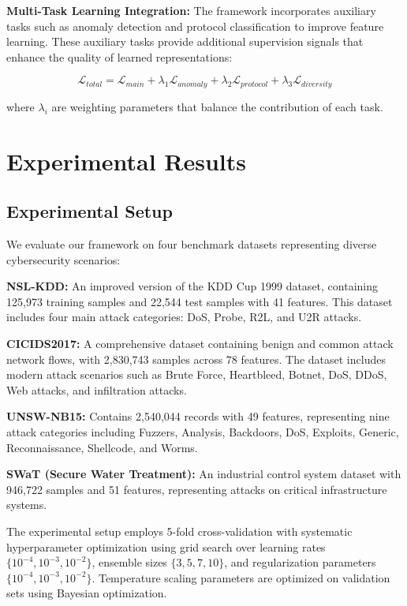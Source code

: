 \documentclass[journal]{IEEEtran}
\begin{document}
\textbf{Multi-Task Learning Integration:} The framework incorporates auxiliary tasks such as anomaly detection and protocol classification to improve feature learning. These auxiliary tasks provide additional supervision signals that enhance the quality of learned representations:

\begin{equation}
\mathcal{L}_{total} = \mathcal{L}_{main} + \lambda_1 \mathcal{L}_{anomaly} + \lambda_2 \mathcal{L}_{protocol} + \lambda_3 \mathcal{L}_{diversity}
\end{equation}

where $\lambda_i$ are weighting parameters that balance the contribution of each task.

\section{Experimental Results}

\subsection{Experimental Setup}

We evaluate our framework on four benchmark datasets representing diverse cybersecurity scenarios:

\textbf{NSL-KDD:} An improved version of the KDD Cup 1999 dataset, containing 125,973 training samples and 22,544 test samples with 41 features. This dataset includes four main attack categories: DoS, Probe, R2L, and U2R attacks.

\textbf{CICIDS2017:} A comprehensive dataset containing benign and common attack network flows, with 2,830,743 samples across 78 features. The dataset includes modern attack scenarios such as Brute Force, Heartbleed, Botnet, DoS, DDoS, Web attacks, and infiltration attacks.

\textbf{UNSW-NB15:} Contains 2,540,044 records with 49 features, representing nine attack categories including Fuzzers, Analysis, Backdoors, DoS, Exploits, Generic, Reconnaissance, Shellcode, and Worms.

\textbf{SWaT (Secure Water Treatment):} An industrial control system dataset with 946,722 samples and 51 features, representing attacks on critical infrastructure systems.

The experimental setup employs 5-fold cross-validation with systematic hyperparameter optimization using grid search over learning rates $\{10^{-4}, 10^{-3}, 10^{-2}\}$, ensemble sizes $\{3, 5, 7, 10\}$, and regularization parameters $\{10^{-4}, 10^{-3}, 10^{-2}\}$. Temperature scaling parameters are optimized on validation sets using Bayesian optimization.
\end{document}
